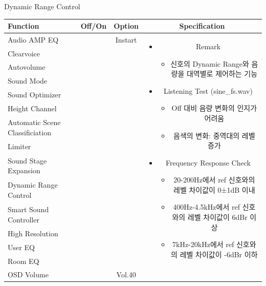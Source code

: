 \documentclass{beamer}
\begin{document}
\begin{frame}[t]{Dynamic Range Control}
\begin{tiny}
\begin{tabular}{@{}lccc@{}}
\toprule
Function & Off/On & Option & Specification \\
\midrule
Audio AMP EQ & \color{black}{Off} & Instart &
\multirow{14}{60mm}{
\begin{itemize}
\item Remark
	\begin{itemize}
	\item 신호의 Dynamic Range와 음량을 대역별로 제어하는 기능
	\end{itemize}
\item Listening Test (sine\_fs.wav)
	\begin{itemize}
	\item Off 대비 음량 변화의 인지가 어려움
	\item 음색의 변화: 중역대의 레벨 증가
	\end{itemize}
\item Frequency Response Check
  \begin{itemize}
  \item 20-200Hz에서 ref 신호와의 레벨 차이값이 0±1dB 이내
  \item 400Hz-4.5kHz에서 ref 신호와의 레벨 차이값이 6dBr 이상
  \item 7kHz-20kHz에서 ref 신호와의 레벨 차이값이 -6dBr 이하
  \end{itemize}
\end{itemize}
} \\
Clearvoice & \color{black}{Off} & & \\
Autovolume & \color{black}{Off} & & \\
Sound Mode & \color{black}{Off} & & \\
Sound Optimizer & \color{black}{Off} & & \\
Height Channel & \color{black}{Off} & & \\
Automatic Scene Classificiation & \color{black}{Off} & & \\
Limiter & \color{black}{Off} & & \\
Sound Stage Expansion & \color{black}{Off} & & \\
Dynamic Range Control & \color{blue}{On} & & \\
Smart Sound Controller & \color{black}{Off} & & \\
High Resolution & \color{black}{Off} & & \\
User EQ & \color{black}{Off} & & \\
Room EQ & \color{black}{Off} & & \\
OSD Volume & \color{blue}{On} & Vol.40 & \\
\midrule
\end{tabular}
\end{tiny}


\end{frame}
\end{document}
